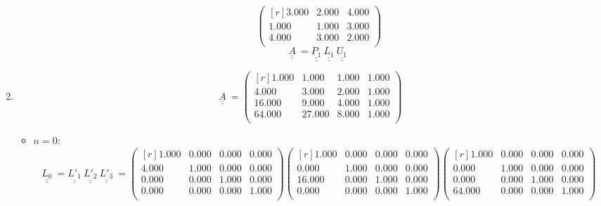 \documentclass{report}[10pts]
\begin{document}
\begin{enumerate}[- Ex. 1]
\begin{itemize}
\[\begin{pmatrix*}[r]
         3.000 & 2.000 & 4.000\\
         1.000 & 1.000 & 3.000\\
         4.000 & 3.000 & 2.000\\
      \end{pmatrix*}
\]
\[
   \underline{\underline{A}}~
   =
   \underline{\underline{P_{1}}}~
   \underline{\underline{L_{1}}}~
   \underline{\underline{U_{1}}}~
\]
\end{itemize}
\clearpage
\item
\[
   \underline{\underline{A}}~
   =
      \begin{pmatrix*}[r]
         1.000 & 1.000 & 1.000 & 1.000\\
         4.000 & 3.000 & 2.000 & 1.000\\
         16.000 & 9.000 & 4.000 & 1.000\\
         64.000 & 27.000 & 8.000 & 1.000\\
      \end{pmatrix*}
\]
\begin{itemize}
\item $n=0$:
\[
   \underline{\underline{L_{0}}}~
   =
   \underline{\underline{L'_{1}}}~
   \underline{\underline{L'_{2}}}~
   \underline{\underline{L'_{3}}}~
   =
      \begin{pmatrix}[r]
         1.000 & 0.000 & 0.000 & 0.000\\
         4.000 & 1.000 & 0.000 & 0.000\\
         0.000 & 0.000 & 1.000 & 0.000\\
         0.000 & 0.000 & 0.000 & 1.000\\
      \end{pmatrix}
      \begin{pmatrix}[r]
         1.000 & 0.000 & 0.000 & 0.000\\
         0.000 & 1.000 & 0.000 & 0.000\\
         16.000 & 0.000 & 1.000 & 0.000\\
         0.000 & 0.000 & 0.000 & 1.000\\
      \end{pmatrix}
      \begin{pmatrix}[r]
         1.000 & 0.000 & 0.000 & 0.000\\
         0.000 & 1.000 & 0.000 & 0.000\\
         0.000 & 0.000 & 1.000 & 0.000\\
         64.000 & 0.000 & 0.000 & 1.000\\
      \end{pmatrix}
\]
\end{itemize}
\end{enumerate}
\end{document}
